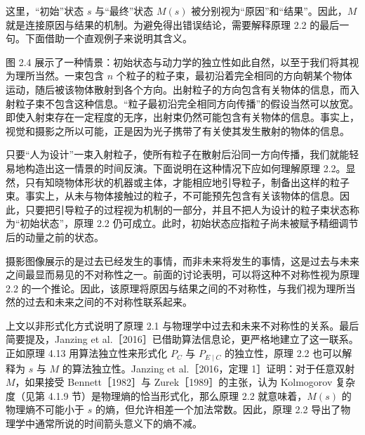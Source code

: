 这里，“初始”状态 $s$ 与“最终”状态 $M(s)$ 被分别视为“原因”和“结果”。因此，$M$ 就是连接原因与结果的机制。为避免得出错误结论，需要解释原理 2.2 的最后一句。下面借助一个直观例子来说明其含义。

图 2.4 展示了一种情景：初始状态与动力学的独立性如此自然，以至于我们将其视为理所当然。一束包含 $n$ 个粒子的粒子束，最初沿着完全相同的方向朝某个物体运动，随后被该物体散射到各个方向。出射粒子的方向包含有关物体的信息，而入射粒子束不包含这种信息。“粒子最初沿完全相同方向传播”的假设当然可以放宽。即使入射束存在一定程度的无序，出射束仍然可能包含有关物体的信息。事实上，视觉和摄影之所以可能，正是因为光子携带了有关使其发生散射的物体的信息。

只要“人为设计”一束入射粒子，使所有粒子在散射后沿同一方向传播，我们就能轻易地构造出这一情景的时间反演。下面说明在这种情况下应如何理解原理 2.2。显然，只有知晓物体形状的机器或主体，才能相应地引导粒子，制备出这样的粒子束。事实上，从未与物体接触过的粒子，不可能预先包含有关该物体的信息。因此，只要把引导粒子的过程视为机制的一部分，并且不把人为设计的粒子束状态称为“初始状态”，原理 2.2 仍可成立。此时，初始状态应指粒子尚未被赋予精细调节后的动量之前的状态。

摄影图像展示的是过去已经发生的事情，而非未来将发生的事情，这是过去与未来之间最显而易见的不对称性之一。前面的讨论表明，可以将这种不对称性视为原理 2.2 的一个推论。因此，该原理将原因与结果之间的不对称性，与我们视为理所当然的过去和未来之间的不对称性联系起来。

上文以非形式化方式说明了原理 2.1 与物理学中过去和未来不对称性的关系。最后简要提及，Janzing et al.［2016］已借助算法信息论，更严格地建立了这一联系。正如原理 4.13 用算法独立性来形式化 $P_C$ 与 $P_{E\mid C}$ 的独立性，原理 2.2 也可以解释为 $s$ 与 $M$ 的算法独立性。Janzing et al.［2016，定理 1］证明：对于任意双射 $M$，如果接受 Bennett［1982］与 Zurek［1989］的主张，认为 Kolmogorov 复杂度（见第 4.1.9 节）是物理熵的恰当形式化，那么原理 2.2 就意味着，$M(s)$ 的物理熵不可能小于 $s$ 的熵，但允许相差一个加法常数。因此，原理 2.2 导出了物理学中通常所说的时间箭头意义下的熵不减。
\FloatBarrier
